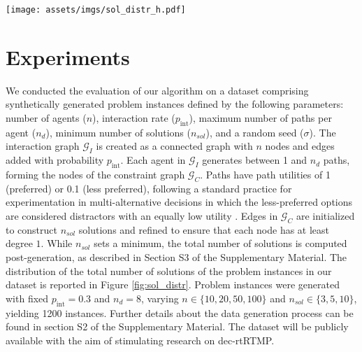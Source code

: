 \begin{figure*}[!t]
    \centering
    \texttt{[image: assets/imgs/sol\_distr\_h.pdf]}
    \caption{Distribution of the number of solutions per problem instance. Problem instances are grouped by the number of agents $n$ and by minimum number of solutions $n_{sol}$ we require the problem instance to have. For each combination of $n$ and $n_{sol}$, there are $100$ problem instances in our dataset. As evident from panels in the bottom left of the figure, when we add solutions to a graph $\mathcal{G}_C$ with few nodes, there is a high probability that the links of two solutions can be combined to form new solutions that we have not been explicitly inserted in the graph. This happens less frequently as the number of nodes in $\mathcal{G}_C$ increases.}
    \label{fig:sol_distr}
\end{figure*}

\section{Experiments}\label{sec:exps}

We conducted the evaluation of our algorithm on a dataset comprising synthetically generated problem instances defined by the following parameters: number of agents ($n$), interaction rate ($p_{\operatorname{int}}$), maximum number of paths per agent ($n_d$), minimum number of solutions ($n_{sol}$), and a random seed ($\sigma$). The interaction graph $\mathcal{G}_I$ is created as a connected graph with $n$ nodes and edges added with probability $p_{\operatorname{int}}$. Each agent in $\mathcal{G}_I$ generates between 1 and $n_d$ paths, forming the nodes of the constraint graph $\mathcal{G}_C$. Paths have path utilities of 1 (preferred) or 0.1 (less preferred), following a standard practice for experimentation in multi-alternative decisions in which the less-preferred options are considered distractors with an equally low utility \cite{Reina:2017jl}. Edges in $\mathcal{G}_C$ are initialized to construct $n_{sol}$ solutions and refined to ensure that each node has at least degree $1$. While $n_{sol}$ sets a minimum, the total number of solutions is computed post-generation, as described in  Section S3 of the Supplementary Material. The distribution of the total number of solutions of the problem instances in our dataset is reported in Figure \ref{fig:sol_distr}. Problem instances were generated with fixed $p_{\operatorname{int}}=0.3$ and $n_d=8$, varying $n \in \{10, 20, 50, 100\}$ and $n_{sol} \in \{3, 5, 10\}$, yielding 1200 instances. Further details about the data generation process can be found in section S2 of the Supplementary Material. The dataset will be publicly available with the aim of stimulating research on dec-rtRTMP.

